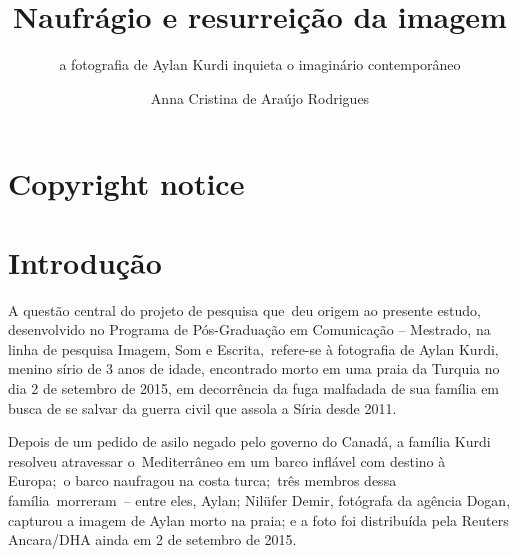 \documentclass[
  letterpaper,
]{scrbook}
\title{Naufrágio e resurreição da imagem}
\subtitle{a fotografia de Aylan Kurdi inquieta o imaginário
contemporâneo}
\author{Anna Cristina de Araújo Rodrigues}
\date{}
\renewcommand*\contentsname{Índice}
\newcommand\contentsname{Índice}
\begin{document}
\frontmatter
\maketitle


\ifdefined\Shaded\renewenvironment{Shaded}{\begin{tcolorbox}[breakable, borderline west={3pt}{0pt}{shadecolor}, boxrule=0pt, enhanced, frame hidden, sharp corners, interior hidden]}{\end{tcolorbox}}\fi

\renewcommand*\contentsname{Sumário}
{
\setcounter{tocdepth}{2}
\tableofcontents
}
\mainmatter
{}

\hypertarget{copyright-notice}{%
\chapter*{Copyright notice}\label{copyright-notice}}



\hypertarget{introduuxe7uxe3o}{%
\chapter{Introdução}\label{introduuxe7uxe3o}}

A questão central do projeto de pesquisa que~deu origem ao presente
estudo, desenvolvido no Programa de Pós-Graduação em Comunicação --
Mestrado, na linha de pesquisa Imagem, Som e Escrita,~refere-se à
fotografia de Aylan Kurdi, menino sírio de 3 anos de idade, encontrado
morto em uma praia da Turquia no dia 2 de setembro de 2015, em
decorrência da fuga malfadada de sua família em busca de se salvar da
guerra civil que assola a Síria desde 2011.~

Depois de um pedido de asilo negado pelo governo do Canadá, a família
Kurdi resolveu atravessar o~Mediterrâneo em um barco inflável com
destino à Europa;~o barco naufragou na costa turca;~três membros dessa
família~morreram~-- entre eles, Aylan; Nilüfer Demir, fotógrafa da
agência Dogan, capturou a imagem de Aylan morto na praia; e a foto foi
distribuída pela Reuters Ancara/DHA ainda em 2 de setembro de 2015.
\end{document}
